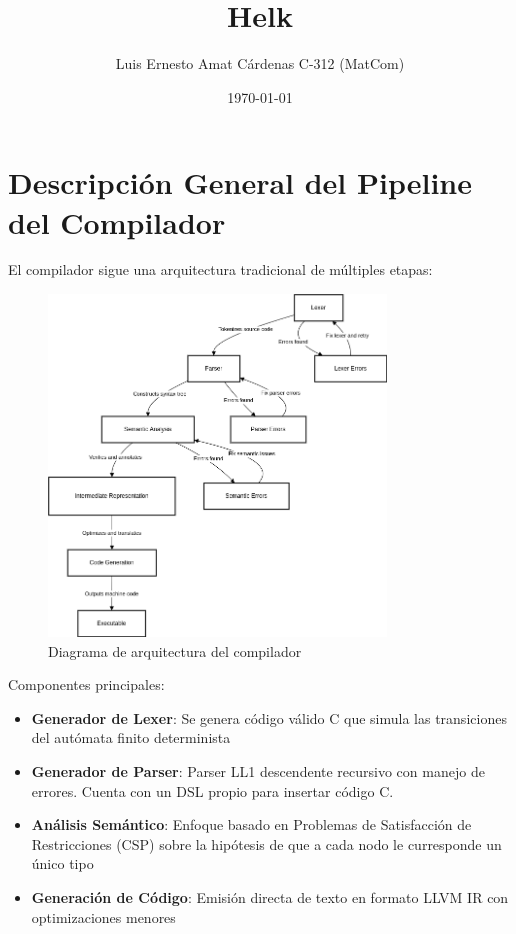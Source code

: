 \documentclass[11pt]{article}
\title{Helk}
\author{Luis Ernesto Amat Cárdenas C-312 (MatCom)}
\date{\today}
\begin{document}
\maketitle

\section{Descripción General del Pipeline del Compilador}
El compilador sigue una arquitectura tradicional de múltiples etapas:

\begin{figure}[h]
\centering
\includegraphics[width=0.8\textwidth]{compiler_pipeline.png}
\caption{Diagrama de arquitectura del compilador}
\end{figure}

Componentes principales:
\begin{itemize}
\item \textbf{Generador de Lexer}: Se genera código válido C que simula las transiciones del autómata finito determinista
\item \textbf{Generador de Parser}: Parser LL1 descendente recursivo con manejo de errores. Cuenta con un DSL propio para insertar código C.
\item \textbf{Análisis Semántico}: Enfoque basado en Problemas de Satisfacción de Restricciones (CSP) sobre la hipótesis de que a cada nodo le curresponde un único tipo
\item \textbf{Generación de Código}: Emisión directa de texto en formato LLVM IR con optimizaciones menores
\end{itemize}
\end{document}
